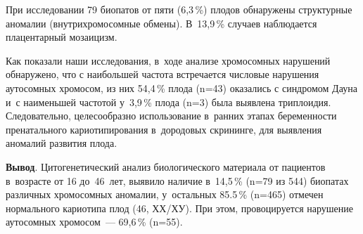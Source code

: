 

При исследовании 79 биопатов от пяти (6,3\,\%) плодов обнаружены структурные аномалии (внутрихромосомные обмены). В~13,9\,\% случаев наблюдается плацентарный мозаицизм.

Как показали наши исследования, в~ходе анализе хромосомных нарушений обнаружено, что с наибольшей частота встречается числовые нарушения аутосомных хромосом, из них 54,4\,\% плода (n=43) оказались с синдромом Дауна и~с наименьшей частотой у~3,9\,\% плода (n=3) была выявлена триплоидия. Следовательно, целесообразно использование в~ранних этапах беременности пренатального кариотипирования в~дородовых скрининге, для выявления аномалий развития плода.

\textbf{Вывод}. Цитогенетический анализ биологического материала от пациентов в~возрасте от 16 до~46~лет, выявило наличие в~14,5\,\% (n=79 из 544) биопатах различных хромосомных аномалии, у~остальных 85.5\,\% (n=465) отмечен нормального кариотипа плод (46, ХХ/ХУ). При этом, провоцируется нарушение аутосомных хромосом~--- 69,6\,\% (n=55).

